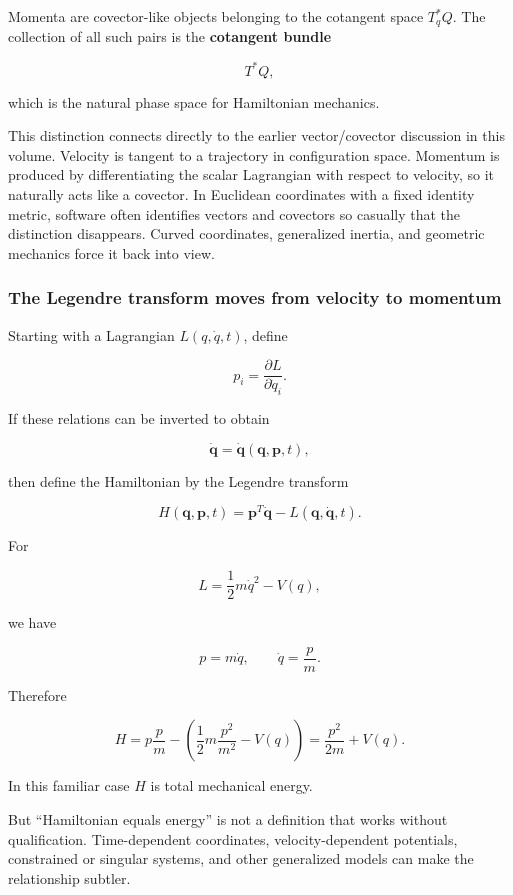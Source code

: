 Momenta are covector-like objects belonging to the cotangent space \(T_q^*Q\). The collection of all such pairs is the \textbf{cotangent bundle}

\[
\boxed{T^*Q,}
\]

which is the natural phase space for Hamiltonian mechanics.

This distinction connects directly to the earlier vector/covector discussion in this volume. Velocity is tangent to a trajectory in configuration space. Momentum is produced by differentiating the scalar Lagrangian with respect to velocity, so it naturally acts like a covector. In Euclidean coordinates with a fixed identity metric, software often identifies vectors and covectors so casually that the distinction disappears. Curved coordinates, generalized inertia, and geometric mechanics force it back into view.

\subsubsection{The Legendre transform moves from velocity to momentum}\label{02-foundations-ii-ch025-the-legendre-transform-moves-from-velocity-to-momentum}

Starting with a Lagrangian \(L(q,\dot q,t)\), define

\[
p_i=\frac{\partial L}{\partial\dot q_i}.
\]

If these relations can be inverted to obtain

\[
\dot{\mathbf q}
=
\dot{\mathbf q}(\mathbf q,\mathbf p,t),
\]

then define the Hamiltonian by the Legendre transform

\[
\boxed{
H(\mathbf q,\mathbf p,t)
=
\mathbf p^T\dot{\mathbf q}
-
L(\mathbf q,\dot{\mathbf q},t)
}.
\]

For

\[
L=\frac12m\dot q^2-V(q),
\]

we have

\[
p=m\dot q,
\qquad
\dot q=\frac pm.
\]

Therefore

\[
H
=
p\frac pm
-
\left(
\frac12m\frac{p^2}{m^2}
-
V(q)
\right)
=
\boxed{
\frac{p^2}{2m}+V(q)
}.
\]

In this familiar case \(H\) is total mechanical energy.

But ``Hamiltonian equals energy'' is not a definition that works without qualification. Time-dependent coordinates, velocity-dependent potentials, constrained or singular systems, and other generalized models can make the relationship subtler.

